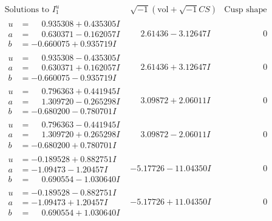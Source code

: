 \documentclass[1p]{elsarticle_modified}
\theoremstyle{definition}
\newcommand{\I}{\sqrt{-1}}
\begin{document}
$$\begin{array}{c|c|c}  
\text{Solutions to }I^u_{1}& \I (\text{vol} + \sqrt{-1}CS) & \text{Cusp shape}\\
 \hline 
\begin{aligned}
u &= \phantom{-}0.935308 + 0.435305 I \\
a &= \phantom{-}0.630371 - 0.162057 I \\
b &= -0.660075 + 0.935719 I\end{aligned}
 & \phantom{-}2.61436 - 3.12647 I & \phantom{-0.000000 } 0 \\ \hline\begin{aligned}
u &= \phantom{-}0.935308 - 0.435305 I \\
a &= \phantom{-}0.630371 + 0.162057 I \\
b &= -0.660075 - 0.935719 I\end{aligned}
 & \phantom{-}2.61436 + 3.12647 I & \phantom{-0.000000 } 0 \\ \hline\begin{aligned}
u &= \phantom{-}0.796363 + 0.441945 I \\
a &= \phantom{-}1.309720 - 0.265298 I \\
b &= -0.680200 - 0.780701 I\end{aligned}
 & \phantom{-}3.09872 + 2.06011 I & \phantom{-0.000000 } 0 \\ \hline\begin{aligned}
u &= \phantom{-}0.796363 - 0.441945 I \\
a &= \phantom{-}1.309720 + 0.265298 I \\
b &= -0.680200 + 0.780701 I\end{aligned}
 & \phantom{-}3.09872 - 2.06011 I & \phantom{-0.000000 } 0 \\ \hline\begin{aligned}
u &= -0.189528 + 0.882751 I \\
a &= -1.09473 - 1.20457 I \\
b &= \phantom{-}0.690554 - 1.030640 I\end{aligned}
 & -5.17726 - 11.04350 I & \phantom{-0.000000 } 0 \\ \hline\begin{aligned}
u &= -0.189528 - 0.882751 I \\
a &= -1.09473 + 1.20457 I \\
b &= \phantom{-}0.690554 + 1.030640 I\end{aligned}
 & -5.17726 + 11.04350 I & \phantom{-0.000000 } 0 \\ \hline\begin{aligned}

\end{aligned}
\end{array}$$
\end{document}
